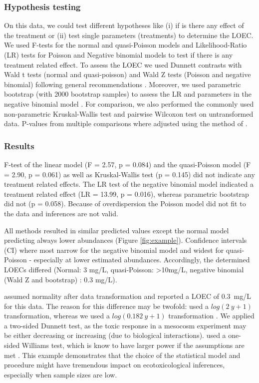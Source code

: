 \documentclass{scrartcl}
\begin{document}
\subsubsection{Hypothesis testing}

On this data, we could test different hypotheses like (i) if is there any effect of the treatment or (ii) test single parameters (treatments) to determine the LOEC.
We used F-tests for the normal and quasi-Poisson models and Likelihood-Ratio (LR) tests for Poisson and Negative binomial models to test if there is any treatment related effect.
To assess the LOEC we used Dunnett contrasts with Wald t tests (normal and quasi-poisson) and Wald Z tests (Poisson and negative binomial) following general recommendations \citep{bolker_generalized_2009}. 
Moreover, we used parametric bootstrap (with 2000 bootstrap samples) to assess the LR and parameters in the negative binomial model \citep{faraway_extending_2006}.
For comparison, we also performed the commonly used non-parametric Kruskal-Wallis test and pairwise Wilcoxon test on untransformed data.
P-values from multiple comparisons where adjusted using the method of \citet{holm_simple_1979}.


\subsubsection{Results}
F-test of the linear model  (F = 2.57, p = 0.084) and the quasi-Poisson model (F = 2.90, p = 0.061) as well as Kruskal-Wallis test (p = 0.145) did not indicate any treatment related effects.
The LR test of the negative binomial model indicated a treatment related effect (LR = 13.99, p = 0.016), whereas parametric bootstrap did not (p = 0.058).
Because of overdispersion the Poisson model did not fit to the data and inferences are not valid. 

All methods resulted in similar predicted values except the normal model predicting always lower abundances (Figure \ref{fig:example}). 
Confidence intervals (CI) where most narrow for the negative binomial model and widest for quasi-Poisson - especially at lower estimated abundances.
Accordingly, the determined LOECs differed (Normal: 3 mg/L, quasi-Poisson: \textgreater 10mg/L, negative binomial (Wald Z and bootstrap) : 0.3 mg/L).

\citet{brock_minimum_2014} assumed normality after data transformation and reported a LOEC of \mbox{0.3 mg/L} for this data.
The reason for this difference may be twofold: \citep{brock_minimum_2014} used a $log(2~y + 1)$ transformation, whereas we used a $log(0.182~y + 1)$ transformation \citep{van_den_brink_impact_2000}.
We applied a two-sided Dunnett test, as the toxic response in a mesocosm experiment may be either decreasing or increasing (due to biological interactions).
\citet{brock_minimum_2014} used a one-sided Williams test, which is know to have larger power if the assumptions are met \citep{jaki_statistical_2013}.
This example demonstrates that the choice of the statistical model and procedure might have tremendous impact on ecotoxicological inferences, especially when sample sizes are low.
\end{document}
